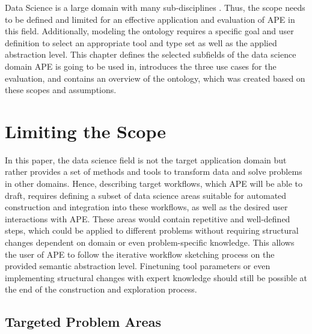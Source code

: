 Data Science is a large domain with many sub-disciplines \cite{sarker2021data, cao2017data}. Thus, the scope needs to be defined and limited for an effective application and evaluation of APE in this field. Additionally, modeling the ontology requires a specific goal and user definition \cite{noy2001ontology} to select an appropriate tool and type set as well as the applied abstraction level. This chapter defines the selected subfields of the data science domain APE is going to be used in, introduces the three use cases for the evaluation, and contains an overview of the ontology, which was created based on these scopes and assumptions.

\section{Limiting the Scope}
In this paper, the data science field is not the target application domain but rather provides a set of methods and tools to transform data and solve problems in other domains. Hence, describing target workflows, which APE will be able to draft, requires defining a subset of data science areas suitable for automated construction and integration into these workflows, as well as the desired user interactions with APE. These areas would contain repetitive and well-defined steps, which could be applied to different problems without requiring structural changes dependent on domain or even problem-specific knowledge. This allows the user of APE to follow the iterative workflow sketching process on the provided semantic abstraction level. Finetuning tool parameters or even implementing structural changes with expert knowledge should still be possible at the end of the construction and exploration process.

\subsection{Targeted Problem Areas}


